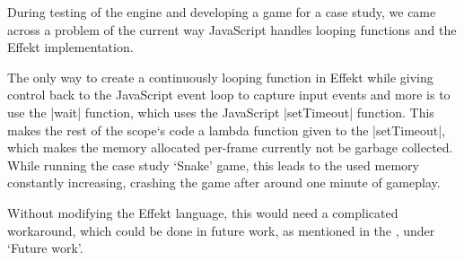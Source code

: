During testing of the engine and developing a game for a case study, we came across a problem of the current way JavaScript handles looping functions and the Effekt implementation.

The only way to create a continuously looping function in Effekt while giving control back to the JavaScript event loop to capture input events and more is to use the |wait| function, which uses the JavaScript |setTimeout| function. This makes the rest of the scope`s code a lambda function given to the |setTimeout|, which makes the memory allocated per-frame currently not be garbage collected. While running the case study `Snake' game, this leads to the used memory constantly increasing, crashing the game after around one minute of gameplay.

Without modifying the Effekt language, this would need a complicated workaround, which could be done in future work, as mentioned in the , under `Future work'.
